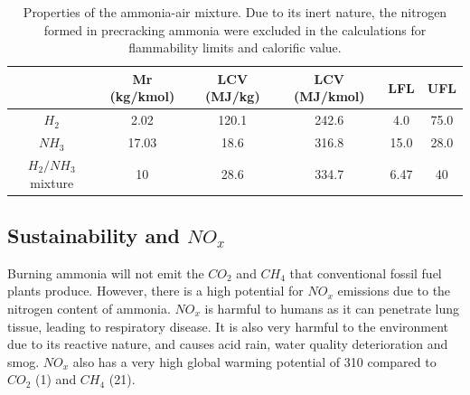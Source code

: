 \documentclass[11pt, oneside]{article}
\begin{document}
\begin{table} [h]
\begin{center}
\caption{Properties of the ammonia-air mixture. Due to its inert nature, the nitrogen formed in precracking ammonia were excluded in the calculations for flammability limits and calorific value. \cite{FL}} \label{tab:mixproperties}
\begin{tabular}{ |c|c|c|c|c|c| }
 \hline
& Mr (kg/kmol) & LCV (MJ/kg) \cite{website:spg}& LCV (MJ/kmol) & LFL & UFL\\ 
 \hline
  $H_2$ & 2.02 & 120.1 & 242.6 & 4.0 & 75.0\\ 
 \hline
$NH_3$ & 17.03 & 18.6 & 316.8 & 15.0 & 28.0\\ 
 \hline
$H_2/NH_3$ mixture & 10 & 28.6 & 334.7 & 6.47 & 40\\
 \hline
\end{tabular}
\end{center} 
\end{table}

\subsection{Sustainability and $NO_x$} \label{ssec:NOx}
Burning ammonia will not emit the $CO_2$ and $CH_4$ that conventional fossil fuel plants produce. However,  there is a high potential for $NO_x$ emissions due to the nitrogen content of ammonia. $NO_x$ is harmful to humans as it can penetrate lung tissue, leading to respiratory disease. It is also very harmful to the environment due to its reactive nature, and causes acid rain, water quality deterioration and smog. \cite{NOxeffect} $NO_x$ also has a very high global warming potential of 310 compared to $CO_2$ (1) and $CH_4$ (21). \cite{website:NOXGWP} %
\end{document}
